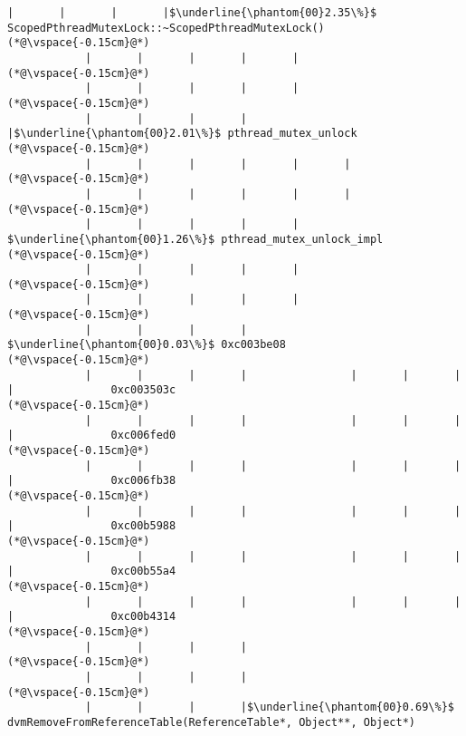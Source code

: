 \begin{lstlisting}[caption=Unicode-merkkijonon osoitinoperaatio, label=profile:C2JReadUnicode-512, numberbychapter=true, frame=lines, float, floatplacement=t]
            |       |       |       |$\underline{\phantom{00}2.35\%}$ ScopedPthreadMutexLock::~ScopedPthreadMutexLock()
(*@\vspace{-0.15cm}@*)
            |       |       |       |       |
(*@\vspace{-0.15cm}@*)
            |       |       |       |       |
(*@\vspace{-0.15cm}@*)
            |       |       |       |       |$\underline{\phantom{00}2.01\%}$ pthread_mutex_unlock
(*@\vspace{-0.15cm}@*)
            |       |       |       |       |       |
(*@\vspace{-0.15cm}@*)
            |       |       |       |       |       |
(*@\vspace{-0.15cm}@*)
            |       |       |       |       |        $\underline{\phantom{00}1.26\%}$ pthread_mutex_unlock_impl
(*@\vspace{-0.15cm}@*)
            |       |       |       |       |
(*@\vspace{-0.15cm}@*)
            |       |       |       |       |
(*@\vspace{-0.15cm}@*)
            |       |       |       |        $\underline{\phantom{00}0.03\%}$ 0xc003be08
(*@\vspace{-0.15cm}@*)
            |       |       |       |                |       |       |       |               0xc003503c
(*@\vspace{-0.15cm}@*)
            |       |       |       |                |       |       |       |               0xc006fed0
(*@\vspace{-0.15cm}@*)
            |       |       |       |                |       |       |       |               0xc006fb38
(*@\vspace{-0.15cm}@*)
            |       |       |       |                |       |       |       |               0xc00b5988
(*@\vspace{-0.15cm}@*)
            |       |       |       |                |       |       |       |               0xc00b55a4
(*@\vspace{-0.15cm}@*)
            |       |       |       |                |       |       |       |               0xc00b4314
(*@\vspace{-0.15cm}@*)
            |       |       |       |
(*@\vspace{-0.15cm}@*)
            |       |       |       |
(*@\vspace{-0.15cm}@*)
            |       |       |       |$\underline{\phantom{00}0.69\%}$ dvmRemoveFromReferenceTable(ReferenceTable*, Object**, Object*)

\end{lstlisting}
